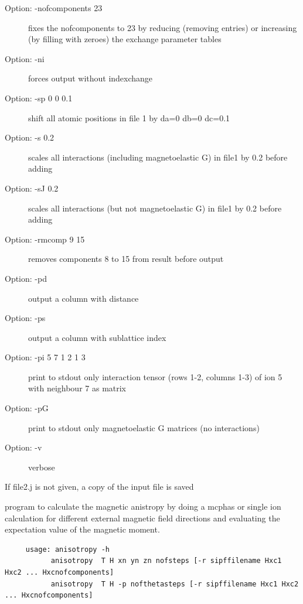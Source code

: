 \begin{description}
\begin{description}
\item[Option: -nofcomponents 23] fixes the nofcomponents to 23 by 
                         reducing (removing entries) or increasing (by filling with zeroes) 
                         the exchange parameter tables
\item[Option:            -ni]  forces output without indexchange 
\item[Option:            -sp  0 0 0.1] shift all atomic positions in file 1 by da=0 db=0 dc=0.1 
\item[Option:            -s  0.2] scales all interactions (including  magnetoelastic G) in file1 by 0.2 before adding 
\item[Option:            -sJ  0.2]scales all interactions (but not 
                        magnetoelastic G) in file1 by 0.2 before adding 
\item[Option:            -rmcomp 9 15 ] removes components 8 to 15 from result before output
\item[Option:            -pd]  output a column with distance  
\item[Option:            -ps]   output a column with sublattice index
\item[Option:            -pi 5 7  1 2 1 3] print to stdout only interaction tensor (rows 1-2, columns 1-3) of ion 5 with neighbour 7 as matrix 
\item[Option:            -pG ] print to stdout only magnetoelastic G matrices (no interactions)
\item[Option:            -v ] verbose 
\end{description}
                 If file2.j is not given, a copy of the input file is saved 
\item [\prg anisotropy\index{anisotropy}\label{anisotropy}:] program to calculate the magnetic anistropy
by doing a mcphas or
               single ion calculation for different external magnetic field
               directions and evaluating the expectation value of the magnetic 
               moment.
\begin{verbatim}
     usage: anisotropy -h
           anisotropy  T H xn yn zn nofsteps [-r sipffilename Hxc1 Hxc2 ... Hxcnofcomponents]
           anisotropy  T H -p nofthetasteps [-r sipffilename Hxc1 Hxc2 ... Hxcnofcomponents]


\end{verbatim}
\end{description}

